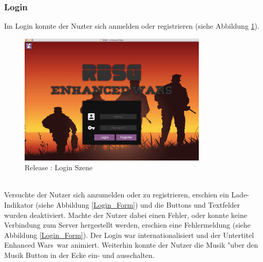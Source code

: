 \documentclass[12pt, titlepage]{scrartcl}
\newcommand{\RN}[1]{%
	\textup{\uppercase\expandafter{\romannumeral#1}}%
}
\begin{document}
            \subsubsection{Login}
                Im Login konnte der Nuzter sich anmelden oder registrieren (siehe Abbildung \ref{Login}). \\
                \begin{figure}[H] 
    				\centering
    				\includegraphics[width=0.8\textwidth]{images/old_state/login/Login.png}
    				\caption{Release \RN{2}: Login Szene}
    				\label{Login}
			    \end{figure}
			    \ \\ Versuchte der Nutzer sich anzumelden oder zu registrieren, erschien ein Lade-Indikator (siehe Abbildung \ref{Login_Form}) und die Buttons und Textfelder wurden deaktiviert. Machte der Nutzer dabei einen Fehler, oder konnte keine Verbindung zum Server hergestellt werden, erschien eine Fehlermeldung (siehe Abbildung \ref{Login_Form}). Der Login war internationalisiert und der Untertitel \glqq Enhanced Wars\grqq\ war animiert. Weiterhin konnte der Nutzer die Musik "uber den Musik Button in der Ecke ein- und ausschalten. \\
\end{document}
